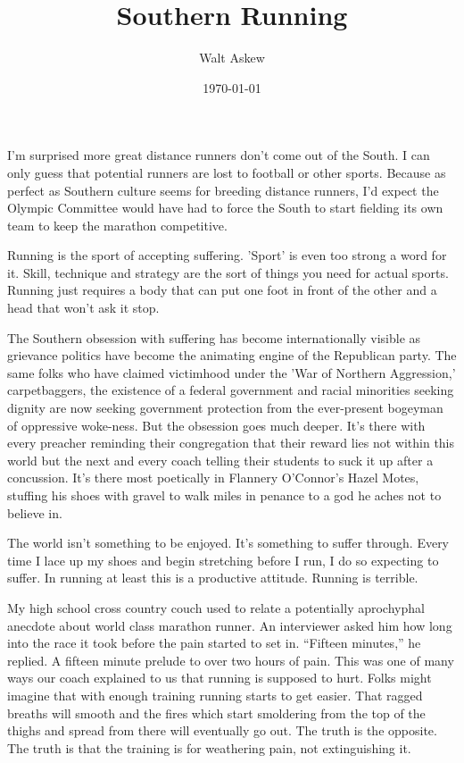 \documentclass[14pt, oneside]{memoir}
\title{Southern Running}
\author{Walt Askew}
\date{\today}
\begin{document}
\maketitle

I'm surprised more great distance runners don't come out of the
South.
I can only guess that potential runners are lost to football or other
sports.
Because as perfect as Southern culture seems for breeding distance
runners, I'd expect the Olympic Committee would have had to force the
South to start fielding its own team to keep the marathon
competitive.

Running is the sport of accepting suffering.
'Sport' is even too strong a word for it.
Skill, technique and strategy are the sort of things you need for
actual sports.
Running just requires a body that can put one foot in front of the
other and a head that won't ask it stop.

The Southern obsession with suffering has become internationally
visible as grievance politics have become the animating engine of the
Republican party.
The same folks who have claimed victimhood under the 'War of Northern
Aggression,' carpetbaggers, the existence of a federal government and
racial minorities seeking dignity are now seeking government
protection from the ever-present bogeyman of oppressive woke-ness.
But the obsession goes much deeper.
It's there with every preacher reminding their congregation that their
reward lies not within this world but the next and every coach telling
their students to suck it up after a concussion.
It's there most poetically in Flannery O'Connor's Hazel Motes,
stuffing his shoes with gravel to walk miles in penance to a god he
aches not to believe in.

The world isn't something to be enjoyed.
It's something to suffer through.
Every time I lace up my shoes and begin stretching before I run, I do
so expecting to suffer.
In running at least this is a productive attitude.
Running is terrible.

My high school cross country couch used to relate a potentially
aprochyphal anecdote about world class marathon runner.
An interviewer asked him how long into the race it took before the
pain started to set in.
``Fifteen minutes,'' he replied.
A fifteen minute prelude to over two hours of pain.
This was one of many ways our coach explained to us that running is
supposed to hurt.
Folks might imagine that with enough training running starts to get
easier.
That ragged breaths will smooth and the fires which start smoldering
from the top of the thighs and spread from there will eventually go
out.
The truth is the opposite.
The truth is that the training is for weathering pain, not
extinguishing it.
\end{document}
